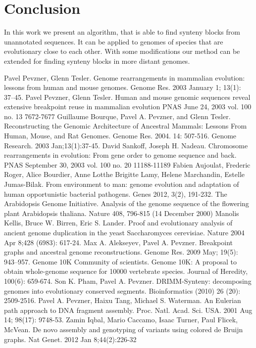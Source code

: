 \documentclass[a4paper, 12pt]{scrartcl}
\begin{document}
\section{Conclusion}
In this work we present an algorithm, that is able to find synteny blocks from unannotated sequences. It can be applied to genomes of species that are 
evolutionary close to each other.
With some modifications our method can be extended for finding synteny blocks in more distant genomes.


\begin{thebibliography}{99}
	Pavel Pevzner, Glenn Tesler.
	Genome rearrangements in mammalian evolution: lessons from human and mouse genomes.
	Genome Res. 2003 January 1; 13(1): 37–45.
	Pavel Pevzner, Glenn Tesler.
	Human and mouse genomic sequences reveal extensive breakpoint reuse in mammalian evolution
	PNAS June 24, 2003  vol. 100  no. 13  7672-7677
	Guillaume Bourque, Pavel A. Pevzner, and Glenn Tesler.
	Reconstructing the Genomic Architecture of Ancestral Mammals: Lessons From Human, Mouse, and Rat Genomes.
	Genome Res. 2004.  14:  507-516.
	Genome Research. 2003 Jan;13(1):37-45.
	David Sankoff, Joseph H. Nadeau.
	Chromosome rearrangements in evolution: From gene order to genome sequence and back.
	PNAS September 30, 2003  vol. 100  no. 20  11188-11189
	Fabien Aujoulat, Frederic Roger, Alice Bourdier, Anne Lotthe  Brigitte Lamy, Helene Marchandin, Estelle Jumas-Bilak.
	From environment to man: genome evolution and adaptation of human opportunistic bacterial pathogens.
	Genes 2012, 3(2), 191-232.
	The Arabidopsis Genome Initiative.
	Analysis of the genome sequence of the flowering plant Arabidopsis thaliana.
	Nature 408, 796-815 (14 December 2000)
	Manolis Kellis, Bruce W. Birren, Eric S. Lander.
	Proof and evolutionary analysis of ancient genome duplication in the yeast Saccharomyces cerevisiae.
	Nature 2004 Apr 8;428 (6983): 617-24.
	Max A. Alekseyev, Pavel A. Pevzner.
	Breakpoint graphs and ancestral genome reconstructions.
	Genome Res. 2009 May; 19(5): 943–957.
	Genome 10K Community of scientists.
	Genome 10K: A proposal to obtain whole-genome sequence for 10000 vertebrate species.
	Journal of Heredity, 100(6): 659-674.
	Son K. Pham, Pavel A. Pevzner.
	DRIMM-Synteny: decomposing genomes into evolutionary conserved segments.
	Bioinformatics (2010)  26  (20):  2509-2516.
	Pavel A. Pevzner, Haixu Tang, Michael S. Waterman.
	An Eulerian path approach to DNA fragment assembly.
	Proc. Natl. Acad. Sci. USA. 2001 Aug 14; 98(17): 9748-53.
	Zamin Iqbal, Mario Caccamo, Isaac Turner, Paul Flicek, McVean.
	De novo assembly and genotyping of variants using colored de Bruijn graphs.
	Nat Genet. 2012 Jan 8;44(2):226-32
\end{thebibliography}
\end{document}
